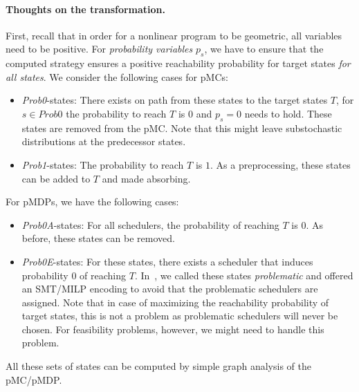 \paragraph{Thoughts on the transformation.}
First, recall that in order for a nonlinear program to be geometric, all variables need to be positive.
For \emph{probability variables} $p_s$, we have to ensure that the computed strategy ensures a positive reachability probability for target states \emph{for all states}. We consider the following cases for pMCs:
\begin{itemize}
	\item \textit{Prob0}-states: There exists on path from these states to the target states $T$, \ie for $s\in\textit{Prob0}$ the probability to reach $T$ is $0$ and $p_s=0$ needs to hold. These states are removed from the pMC. Note that this might leave substochastic distributions at the predecessor states.
	\item \textit{Prob1}-states: The probability to reach $T$ is $1$. As a preprocessing, these states can be added to $T$ and made absorbing.
\end{itemize}
For pMDPs, we have the following cases:
\begin{itemize}
	\item \textit{Prob0A}-states: For all schedulers, the probability of reaching $T$ is $0$. As before, these states can be removed.
	\item \textit{Prob0E}-states: For these states, there exists a scheduler that induces probability $0$ of reaching $T$. In~\cite{wimmer-et-al-tcs-2014}, we called these states \emph{problematic} and offered an SMT/MILP encoding to avoid that the problematic schedulers are assigned. Note that in case of maximizing the reachability probability of target states, this is not a problem as problematic schedulers will never be chosen. For feasibility problems, however, we might need to handle this problem. 
\end{itemize}
All these sets of states can be computed by simple graph analysis of the pMC/pMDP.



